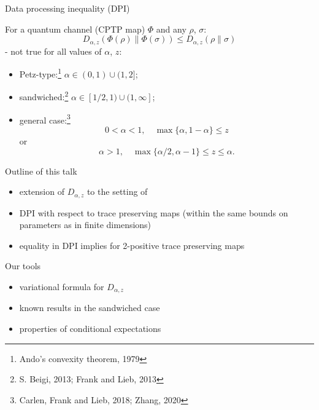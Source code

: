 \documentclass[mathserif]{beamer}
\newcommand{\<}{\langle}
\renewcommand{\>}{\rangle}
\begin{document}
\begin{frame}{Data processing inequality (DPI)}

For a quantum channel (CPTP map) $\Phi$ and any $\rho$, $\sigma$:
\[
D_{\alpha,z}(\Phi(\rho)\|\Phi(\sigma))\le D_{\alpha,z}(\rho\|\sigma)
\]
- not true for all values of $\alpha$, $z$:

\medskip


\begin{itemize}
\item Petz-type:\footnote{Ando's convexity theorem, 1979}  $\alpha\in (0,1)\cup (1,2]$;
\item sandwiched:\footnote{S. Beigi,
2013; Frank and Lieb, 2013}
 $\alpha\in [1/2,1)\cup (1,\infty]$;\item general case:\footnote{Carlen, Frank and Lieb,
 2018; Zhang, 2020}
\[
0 < \alpha < 1,\quad  \max\{\alpha, 1 - \alpha\} \le  z 
\]
or
\[
\alpha > 1,\quad  \max\{\alpha/2, \alpha - 1\} \le  z \le \alpha.
\]
\end{itemize}


\end{frame}

\begin{frame}{Outline of this talk}

\begin{itemize}
\item extension of $D_{\alpha,z}$ to the setting of 

\item  DPI with respect to
 trace preserving maps (within the same bounds on parameters as in
finite dimensions)

\item equality in DPI implies  for 2-positive
trace preserving maps

\end{itemize}

\medskip

Our tools
\medskip

\begin{itemize}
\item  variational formula for $D_{\alpha,z}$
\item known results in the sandwiched case
\item properties of conditional expectations

\end{itemize}


\end{frame}
\end{document}
